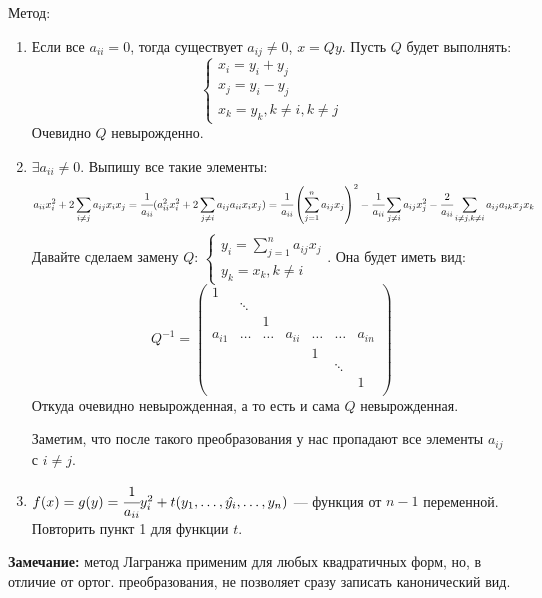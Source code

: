 Метод:
\begin{enumerate}
    \item Если все $a_{ii}=0$, тогда существует $a_{ij}\neq 0$, $x=Qy$. Пусть $Q$ будет выполнять:
    $$\begin{cases}
        x_i = y_i + y_j \\
        x_j  = y_i - y_j\\
        x_k = y_k, k\neq i, k \neq j
    \end{cases}$$
    Очевидно $Q$ невырожденно.
    \item $\exists a_{ii}\neq 0$. Выпишу все такие элементы:
    $$a_{ii}x_i^2 + 2\sum\limits_{i \neq j}a_{ij}x_ix_j = \cfrac{1}{a_{ii}}(a_{ii}^2 x_i^2 + 2\sum\limits_{j\neq i} a_{ij} a_{ii}x_i x_j) = \cfrac{1}{a_{ii}} \left(\sum\limits_{j=1}^n a_{ij} x_j\right)^2 - \cfrac{1}{a_{ii}}\sum\limits_{j \neq i}a_{ij} x_j^2 -  \cfrac{2}{a_{ii}}\sum\limits_{i\neq j, k \neq i} a_{ij}a_{ik}x_j x_k$$
    Давайте сделаем замену $Q$:
    $\begin{cases}
    y_i = \sum\limits_{j=1}^n a_{ij}x_j\\
    y_k = x_k, k \neq i
    \end{cases}$. Она будет иметь вид:
    $$Q^{-1}= \begin{pmatrix}
        1 & & & & &  & \\
         & \ddots& & & &  & \\
         & & 1& & &  & \\
         a_{i1}&\ldots &\ldots &a_{ii} &\ldots &\ldots  &a_{in} \\
         & & & & 1&  & \\
          & & & & &  \ddots& \\
           & & & & &  &1 \\
    \end{pmatrix}$$
    Откуда очевидно невырожденная, а то есть и сама $Q$ невырожденная.

    Заметим, что после такого преобразования у нас пропадают все элементы $a_{ij}$ с $i \neq j$.

    \item $f(x) = g(y) = \cfrac{1}{a_{ii}}y_i^2 + t(y_1,\ldots, \hat{y_i},\ldots, y_n)$ --- функция от $n-1$ переменной. Повторить пункт 1 для функции $t$.
\end{enumerate}

\textbf{Замечание:} метод Лагранжа применим для любых квадратичных форм, но, в отличие от ортог. преобразования, не позволяет сразу записать канонический вид.


